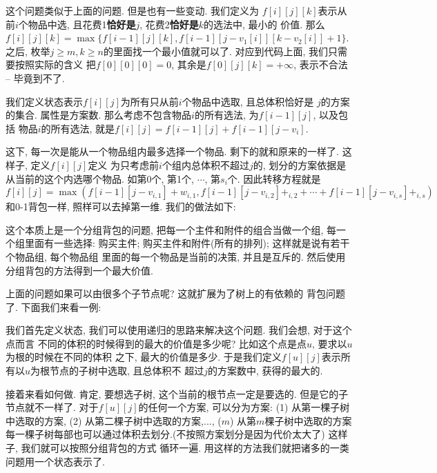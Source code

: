  这个问题类似于上面的问题. 
但是也有一些变动. 我们定义为
$f[i][j][k]$表示从前$i$个物品中选, 且花费1\textbf{恰好是}$j$, 花费2\textbf{恰好是}$k$的选法中, 最小的
价值. 那么$f[i][j][k] = \max\{f[i-1][j][k], f[i-1][j-v_1[i]][k-v_2[i]]+1\}$. 之后, 
枚举$j\geq m, k\geq n$的里面找一个最小值就可以了. 对应到代码上面, 我们只需要按照实际的含义
把$f[0][0][0]=0$, 其余是$f[0][j][k]=+\infty$, 表示不合法 -- 毕竟到不了.  

 
我们定义状态表示$f[i][j]$为所有只从前$i$个物品中选取, 且总体积恰好是
$j$的方案的集合. 属性是方案数. 那么考虑不包含物品$i$的所有选法, 为$f[i-1][j]$, 以及包括
物品$i$的所有选法, 就是$f[i][j] = f[i-1][j]+f[i-1][j-v_i]$. 

 

这下, 每一次是能从一个物品组内最多选择一个物品. 剩下的就和原来的一样了. 这样子, 定义$f[i][j]$定义
为只考虑前$i$个组内总体积不超过$j$的, 划分的方案依据是从当前的这个内选哪个物品. 如第0个, 第1个,
$\cdots$, 第$s_i$个. 因此转移方程就是
$$
f[i][j] = \max(f[i-1][j-v_{i,1}]+w_{i,1}, f[i-1][j-v_{i,2}]+_{i,2}+\cdots + f[i-1][j-v_{i,s}]+_{i,s})
$$
和0-1背包一样, 照样可以去掉第一维. 我们的做法如下: 

 这个本质上是一个分组背包的问题, 把每一个主件和附件的组合当做一个组, 
每一个组里面有一些选择: 购买主件; 购买主件和附件(所有的排列); 这样就是说有若干个物品组, 每个物品组
里面的每一个物品是当前的决策, 并且是互斥的. 然后使用分组背包的方法得到一个最大价值.  

 上面的问题如果可以由很多个子节点呢? 这就扩展为了树上的有依赖的
背包问题了. 下面我们来看一例: 

 我们首先定义状态, 我们可以使用递归的思路来解决这个问题. 我们会想, 对于这个点而言
不同的体积的时候得到的最大的价值是多少呢? 比如这个点是点$u$, 要求以$u$为根的时候在不同的体积
之下, 最大的价值是多少. 于是我们定义$f[u][j]$表示所有以$u$为根节点的子树中选取, 且总体积不
超过$j$的方案数中, 获得的最大的. 

接着来看如何做. 肯定, 要想选子树, 这个当前的根节点一定是要选的. 但是它的子节点就不一样了. 
对于$f[u][j]$的任何一个方案, 可以分为方案: (1) 从第一棵子树中选取的方案, (2) 从第二棵子树中选取的方案,...,
($m$) 从第$m$棵子树中选取的方案
每一棵子树每部也可以通过体积去划分.(不按照方案划分是因为代价太大了) 这样子, 我们就可以按照分组背包的方式
循环一遍. 用这样的方法我们就把诸多的一类问题用一个状态表示了. 

